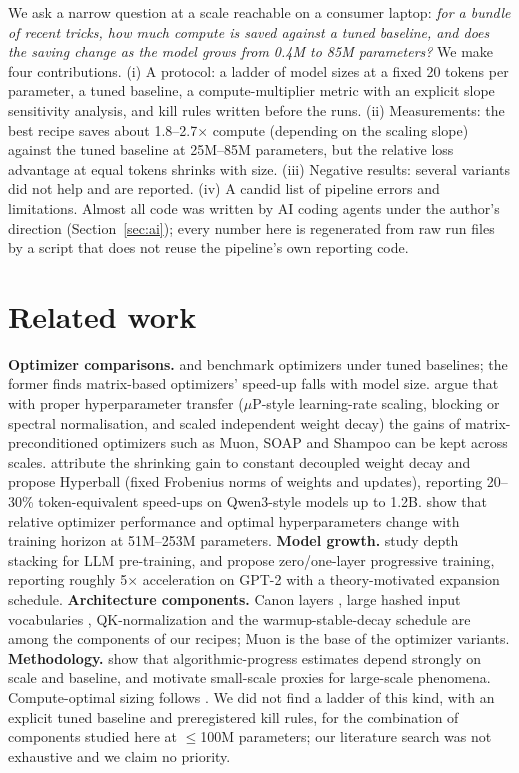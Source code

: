 \documentclass[11pt]{article}
\begin{document}
We ask a narrow question at a scale reachable on a consumer laptop: \emph{for a bundle of recent tricks, how much compute is saved against a tuned baseline, and does the saving change as the model grows from 0.4M to 85M parameters?}
We make four contributions.
(i) A protocol: a ladder of model sizes at a fixed 20 tokens per parameter, a tuned baseline, a compute-multiplier metric with an explicit slope sensitivity analysis, and kill rules written before the runs.
(ii) Measurements: the best recipe saves about 1.8--2.7$\times$ compute (depending on the scaling slope) against the tuned baseline at 25M--85M parameters, but the relative loss advantage at equal tokens shrinks with size.
(iii) Negative results: several variants did not help and are reported.
(iv) A candid list of pipeline errors and limitations.
Almost all code was written by AI coding agents under the author's direction (Section~\ref{sec:ai}); every number here is regenerated from raw run files by a script that does not reuse the pipeline's own reporting code.

\section{Related work}
\textbf{Optimizer comparisons.}
\citet{wen2025fantastic} and \citet{semenov2025benchmarking} benchmark optimizers under tuned baselines; the former finds matrix-based optimizers' speed-up falls with model size.
\citet{qiu2025transfer} argue that with proper hyperparameter transfer ($\mu$P-style learning-rate scaling, blocking or spectral normalisation, and scaled independent weight decay) the gains of matrix-preconditioned optimizers such as Muon, SOAP and Shampoo can be kept across scales.
\citet{wen2026hyperball} attribute the shrinking gain to constant decoupled weight decay and propose Hyperball (fixed Frobenius norms of weights and updates), reporting 20--30\% token-equivalent speed-ups on Qwen3-style models up to 1.2B.
\citet{everett2026memory} show that relative optimizer performance and optimal hyperparameters change with training horizon at 51M--253M parameters.
\textbf{Model growth.}
\citet{du2024stacking} study depth stacking for LLM pre-training, and \citet{bu2025depth} propose zero/one-layer progressive training, reporting roughly 5$\times$ acceleration on GPT-2 with a theory-motivated expansion schedule.
\textbf{Architecture components.}
Canon layers \citep{allenzhu2025canon}, large hashed input vocabularies \citep{huang2025overtok}, QK-normalization and the warmup-stable-decay schedule \citep{hagele2024scaling,hu2024minicpm} are among the components of our recipes; Muon \citep{jordan2024muon,liu2025muon} is the base of the optimizer variants.
\textbf{Methodology.}
\citet{gundlach2025origin} show that algorithmic-progress estimates depend strongly on scale and baseline, and \citet{wortsman2023small} motivate small-scale proxies for large-scale phenomena.
Compute-optimal sizing follows \citet{kaplan2020scaling,hoffmann2022chinchilla}.
We did not find a ladder of this kind, with an explicit tuned baseline and preregistered kill rules, for the combination of components studied here at $\le$100M parameters; our literature search was not exhaustive and we claim no priority.
\end{document}
